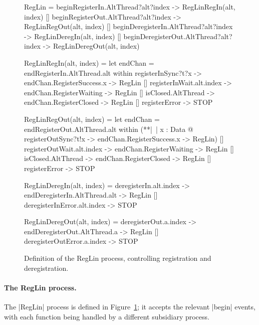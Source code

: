 
\begin{figure}
\begin{cspm}
RegLin = 
  beginRegisterIn.AltThread?alt?index -> RegLinRegIn(alt, index)
  [] beginRegisterOut.AltThread?alt?index -> RegLinRegOut(alt, index)
  [] beginDeregisterIn.AltThread?alt?index -> RegLinDeregIn(alt, index)
  [] beginDeregisterOut.AltThread?alt?index -> RegLinDeregOut(alt, index)
  
RegLinRegIn(alt, index) = 
  let endChan = endRegisterIn.AltThread.alt within
  registerInSync?t?x -> endChan.RegisterSuccess.x -> RegLin
  [] registerInWait.alt.index -> endChan.RegisterWaiting -> RegLin
  [] isClosed.AltThread -> endChan.RegisterClosed -> RegLin
  [] registerError -> STOP

RegLinRegOut(alt, index) = 
  let endChan = endRegisterOut.AltThread.alt within
  (**|~| x : Data @ registerOutSync?t!x -> endChan.RegisterSuccess.x -> RegLin)
  [] registerOutWait.alt.index -> endChan.RegisterWaiting -> RegLin
  [] isClosed.AltThread -> endChan.RegisterClosed -> RegLin
  [] registerError -> STOP
  
RegLinDeregIn(alt, index) = 
  deregisterIn.alt.index -> endDeregisterIn.AltThread.alt -> RegLin
  [] deregisterInError.alt.index -> STOP
    
RegLinDeregOut(alt, index) = 
  deregisterOut.a.index -> endDeregisterOut.AltThread.a -> RegLin
  [] deregisterOutError.a.index -> STOP
\end{cspm}
\caption{Definition of the {\cspmstyle RegLin} process, controlling
  registration and deregistration.  \label{fig:RegLin}}
\end{figure}


\paragraph{The {\cspmstyle RegLin} process.}

The |RegLin| process is defined in Figure~\ref{fig:RegLin}; it accepts the
relevant |begin| events, with each function being handled by a different
subsidiary process. 

